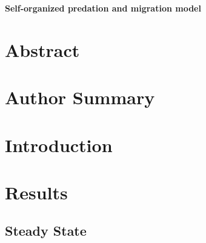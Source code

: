 \documentclass[10pt]{article}
\date{}
\begin{document}
\begin{flushleft}
{\Large
\textbf{Self-organized predation and migration model}
}
\end{flushleft}

\section*{Abstract}

\cite{desantana2013topological}
\section*{Author Summary}

\section*{Introduction}

\section*{Results}

\vspace{0.25cm}
\subsection*{Steady State}

\vspace{0.25cm}
\end{document}
